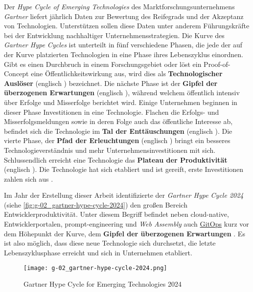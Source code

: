 Der \textit{Hype Cycle of Emerging Technologies} des Marktforschungsunternehmens \textit{Gartner} liefert jährlich Daten zur Bewertung des Reifegrads und der Akzeptanz von Technologien. Unterstützen sollen diese Daten unter anderem Führungskräfte bei der Entwicklung nachhaltiger Unternehmensstrategien. Die Kurve des \textit{Gartner Hype Cycles} ist unterteilt in fünf verschiedene Phasen, die jede der auf der Kurve platzierten Technologien in eine Phase ihres Lebenszyklus einordnen. Gibt es einen Durchbruch in einem Forschungsgebiet oder löst ein Proof-of-Concept eine Öffentlichkeitswirkung aus, wird dies als \textbf{Technologischer Auslöser} (englisch ) bezeichnet. Die nächste Phase ist der \textbf{Gipfel der überzogenen Erwartungen} (englisch ), während welchem öffentlich intensiv über Erfolge und Misserfolge berichtet wird. Einige Unternehmen beginnen in dieser Phase Investitionen in eine Technologie. Flachen die Erfolgs- und Misserfolgsmeldungen sowie in deren Folge auch das öffentliche Interesse ab, befindet sich die Technologie im \textbf{Tal der Enttäuschungen} (englisch ). Die vierte Phase, der \textbf{Pfad der Erleuchtungen} (englisch ) bringt ein besseres Technologieverständnis und mehr Unternehmensinvestitionen mit sich. Schlussendlich erreicht eine Technologie das \textbf{Plateau der Produktivität} (englisch ). Die Technologie hat sich etabliert und ist gereift, erste Investitionen zahlen sich aus \cite{108:Gartner-Hype-Cycle}.

Im Jahr der Erstellung dieser Arbeit identifizierte der \textit{Gartner Hype Cycle 2024} (siehe \autoref{fig:g-02_gartner-hype-cycle-2024}) den großen Bereich Entwicklerproduktivität. Unter diesem Begriff befindet neben \gls{cloud-native}, Entwicklerportalen, \Gls{prompt-engineering} und \textit{Web Assembly} auch \hyperref[sec:03-03_gitops]{GitOps} kurz vor dem Höhepunkt der Kurve, dem \textbf{Gipfel der überzogenen Erwartungen} \cite{106:Gartner-2024-Hype-Cycle-for-Emerging-Technologies}. Es ist also möglich, dass diese neue Technologie sich durchsetzt, die letzte Lebenszyklusphase erreicht und sich in Unternehmen etabliert.

\begin{figure}[h]
    \centering
    \texttt{[image: g-02\_gartner-hype-cycle-2024.png]}
    \caption{Gartner Hype Cycle for Emerging Technologies 2024 \cite{106:Gartner-2024-Hype-Cycle-for-Emerging-Technologies}}
    \label{fig:g-02_gartner-hype-cycle-2024}
\end{figure}

